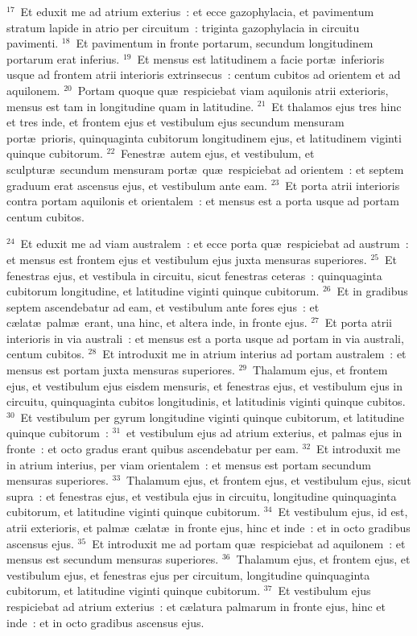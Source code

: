${}^{17}$~Et eduxit me ad atrium exterius~: et ecce gazophylacia, et pavimentum stratum lapide in atrio per circuitum~: triginta gazophylacia in circuitu pavimenti.
${}^{18}$~Et pavimentum in fronte portarum, secundum longitudinem portarum erat inferius.
${}^{19}$~Et mensus est latitudinem a facie port\ae\ inferioris usque ad frontem atrii interioris extrinsecus~: centum cubitos ad orientem et ad aquilonem.
${}^{20}$~Portam quoque qu\ae\ respiciebat viam aquilonis atrii exterioris, mensus est tam in longitudine quam in latitudine.
${}^{21}$~Et thalamos ejus tres hinc et tres inde, et frontem ejus et vestibulum ejus secundum mensuram port\ae\ prioris, quinquaginta cubitorum longitudinem ejus, et latitudinem viginti quinque cubitorum.
${}^{22}$~Fenestr\ae\ autem ejus, et vestibulum, et sculptur\ae\ secundum mensuram port\ae\ qu\ae\ respiciebat ad orientem~: et septem graduum erat ascensus ejus, et vestibulum ante eam.
${}^{23}$~Et porta atrii interioris contra portam aquilonis et orientalem~: et mensus est a porta usque ad portam centum cubitos.


${}^{24}$~Et eduxit me ad viam australem~: et ecce porta qu\ae\ respiciebat ad austrum~: et mensus est frontem ejus et vestibulum ejus juxta mensuras superiores.
${}^{25}$~Et fenestras ejus, et vestibula in circuitu, sicut fenestras ceteras~: quinquaginta cubitorum longitudine, et latitudine viginti quinque cubitorum.
${}^{26}$~Et in gradibus septem ascendebatur ad eam, et vestibulum ante fores ejus~: et c\ae lat\ae\ palm\ae\ erant, una hinc, et altera inde, in fronte ejus.
${}^{27}$~Et porta atrii interioris in via australi~: et mensus est a porta usque ad portam in via australi, centum cubitos.
${}^{28}$~Et introduxit me in atrium interius ad portam australem~: et mensus est portam juxta mensuras superiores.
${}^{29}$~Thalamum ejus, et frontem ejus, et vestibulum ejus eisdem mensuris, et fenestras ejus, et vestibulum ejus in circuitu, quinquaginta cubitos longitudinis, et latitudinis viginti quinque cubitos.
${}^{30}$~Et vestibulum per gyrum longitudine viginti quinque cubitorum, et latitudine quinque cubitorum~:
${}^{31}$~et vestibulum ejus ad atrium exterius, et palmas ejus in fronte~: et octo gradus erant quibus ascendebatur per eam.
${}^{32}$~Et introduxit me in atrium interius, per viam orientalem~: et mensus est portam secundum mensuras superiores.
${}^{33}$~Thalamum ejus, et frontem ejus, et vestibulum ejus, sicut supra~: et fenestras ejus, et vestibula ejus in circuitu, longitudine quinquaginta cubitorum, et latitudine viginti quinque cubitorum.
${}^{34}$~Et vestibulum ejus, id est, atrii exterioris, et palm\ae\ c\ae lat\ae\ in fronte ejus, hinc et inde~: et in octo gradibus ascensus ejus.
${}^{35}$~Et introduxit me ad portam qu\ae\ respiciebat ad aquilonem~: et mensus est secundum mensuras superiores.
${}^{36}$~Thalamum ejus, et frontem ejus, et vestibulum ejus, et fenestras ejus per circuitum, longitudine quinquaginta cubitorum, et latitudine viginti quinque cubitorum.
${}^{37}$~Et vestibulum ejus respiciebat ad atrium exterius~: et c\ae latura palmarum in fronte ejus, hinc et inde~: et in octo gradibus ascensus ejus.


